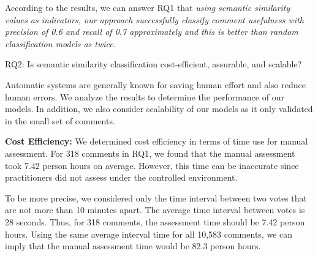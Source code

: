 According to the results, we can answer RQ1 that \emph{using semantic similarity values as indicators, our approach successfully classify comment usefulness with precision of 0.6 and recall of 0.7 approximately and this is better than random  classification models as twice.}








\begin{ResearchQuestions}
\item[RQ2:] Is semantic similarity classification cost-efficient, assurable, and scalable?
\end{ResearchQuestions}

Automatic systems are generally known for saving human effort and also reduce human errors.
We analyze the results to determine the performance of our models.
In addition, we also consider scalability of our models as it only validated in the small set of comments.

\textbf{Cost Efficiency:}
We determined cost efficiency in terms of time use for manual assessment.
For 318 comments in RQ1, we found that the manual assessment took 7.42 person hours on average.
However, this time can be inaccurate since practitioners did not assess under the controlled environment.

To be more precise, we considered only the time interval between two votes that are not more than 10 minutes apart.
The average time interval between votes is 28 seconds.
Thus, for 318 comments, the assessment time should be 7.42 person hours.
Using the same average interval time for all 10,583 comments,
we can imply that the manual assessment time would be 82.3 person hours.

